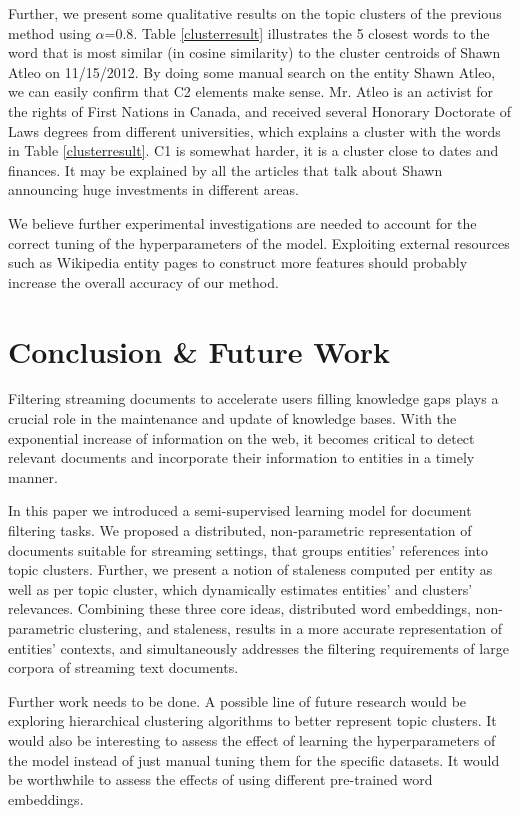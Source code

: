 \documentclass{article}
\begin{document}
{{Further, we present some qualitative results on the topic clusters of the previous method using $\alpha\mathord{=}0.8$. Table \ref{clusterresult} illustrates the 5 closest words to the word that is most similar (in cosine similarity) to the cluster centroids of Shawn Atleo on 11/15/2012.
By doing some manual search on the entity Shawn Atleo, we can easily confirm that C2 elements make sense. Mr. Atleo is an activist for the rights of First Nations in Canada, and received several Honorary Doctorate of Laws degrees from different universities, which explains a cluster with the words in Table \ref{clusterresult}. C1 is somewhat harder, it is a cluster close to dates and finances. It may be explained by all the articles that talk about Shawn announcing huge investments in different areas.

We believe further experimental investigations are needed to account for the correct tuning of the hyperparameters of the model. Exploiting external resources such as Wikipedia entity pages to construct more features \cite{xitong12} should probably increase the overall accuracy of our method. 

\section{Conclusion \& Future Work}
\label{conclusion}

Filtering streaming documents to accelerate users filling knowledge gaps plays a crucial role in the maintenance and update of knowledge bases.
With the exponential increase of information on the web, it becomes critical to detect relevant documents and incorporate their information to entities in a timely manner. %

In this paper we introduced a semi-supervised learning model for document filtering tasks. We proposed a distributed, non-parametric representation of documents suitable for streaming settings, that groups entities' references into topic clusters. Further, we present a notion of staleness computed per entity as well as per topic cluster, which dynamically estimates entities' and clusters' relevances.
Combining these three core ideas, distributed word embeddings, non-parametric clustering, and staleness, results in a more accurate representation of entities' contexts, and simultaneously addresses the filtering requirements of large corpora of streaming text documents.

Further work needs to be done. A possible line of future research would be exploring hierarchical clustering algorithms to better represent topic clusters. It would also be interesting to assess the effect of learning the hyperparameters of the model instead of just manual tuning them for the specific datasets.
It would be worthwhile to assess the effects of using different pre-trained word embeddings.

}}
\end{document}
